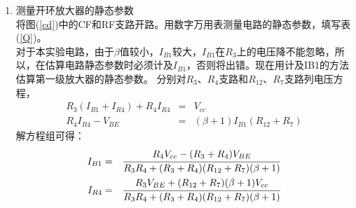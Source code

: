 \documentclass[a4paper]{article}
\begin{document}
\begin{enumerate}
\item 测量开环放大器的静态参数\\
将图(\ref{cd})中的CF和RF支路开路。用数字万用表测量电路的静态参数，填写表(\ref{Q})。\\
对于本实验电路，由于$\beta$值较小，$I_{B1}$较大，$I_{B1}$在$R_3$上的电压降不能忽略，所以，在估算电路静态参数时必须计及$I_{B1}$，否则将出错。现在用计及IB1的方法估算第一级放大器的静态参数。
分别对$R_3$、$R_4$支路和$R_{12}$、$R_7$支路列电压方程，
\begin{eqnarray}
R_3(I_{B1}+I_{R4})+R_4I_{R4} &=& V_{cc}\\
R_4I_{R4}-V_{BE} &=& (\beta+1)I_{B1}(R_{12}+R_7)
\end{eqnarray}
解方程组可得：
\begin{eqnarray}
I_{B1} &=& \cfrac{R_4V_{cc}-(R_3+R_4)V_{BE}}{R_3R_4+(R_3+R_4)(R_{12}+R_7)(\beta+1)}\\\label{IB1}
I_{R4} &=& \cfrac{R_3V_{BE}+(R_{12}+R_7)(\beta+1)V_{cc}}{R_3R_4+(R_3+R_4)(R_{12}+R_7)(\beta+1)}\label{IR4}
\end{eqnarray}


\end{enumerate}
\end{document}
